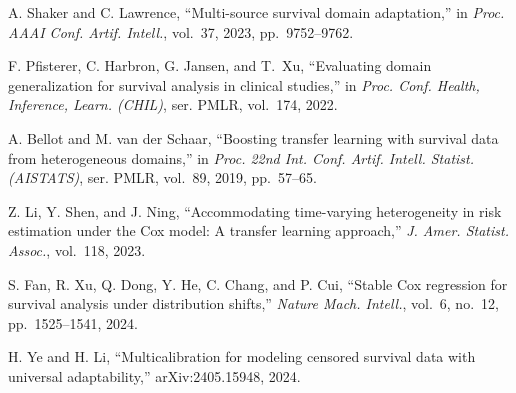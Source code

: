 %
%

 A. Shaker and C. Lawrence, ``Multi-source
survival domain adaptation,'' in \emph{Proc. AAAI Conf. Artif. Intell.},
vol.~37, 2023, pp.~9752--9762.

 F. Pfisterer, C. Harbron, G. Jansen, and
T.~Xu, ``Evaluating domain generalization for survival analysis in clinical
studies,'' in \emph{Proc. Conf. Health, Inference, Learn. (CHIL)}, ser. PMLR,
vol.~174, 2022. %

 A. Bellot and M. van der Schaar, ``Boosting transfer learning
with survival data from heterogeneous domains,'' in \emph{Proc. 22nd Int. Conf.
Artif. Intell. Statist. (AISTATS)}, ser. PMLR, vol.~89, 2019, pp.~57--65.

 Z. Li, Y. Shen, and J. Ning, ``Accommodating
time-varying heterogeneity in risk estimation under the Cox model: A transfer
learning approach,'' \emph{J. Amer. Statist. Assoc.}, vol.~118, 2023.

 S. Fan, R. Xu, Q. Dong, Y. He, C. Chang, and P. Cui,
``Stable Cox regression for survival analysis under distribution shifts,''
\emph{Nature Mach. Intell.}, vol.~6, no.~12, pp.~1525--1541, 2024.

 H. Ye and H. Li, ``Multicalibration for
modeling censored survival data with universal adaptability,''
arXiv:2405.15948, 2024.
